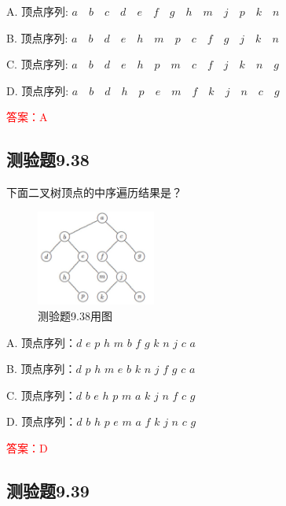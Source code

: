 \documentclass[UTF8, heading=true]{ctexart}
\begin{document}
A. 顶点序列: $a \quad b \quad c \quad d \quad e \quad f \quad g \quad h \quad m \quad j \quad p \quad k \quad n$

B. 顶点序列: $a \quad b \quad d \quad e \quad h \quad m \quad p \quad c \quad f \quad g \quad j \quad k \quad n$

C. 顶点序列: $a \quad b \quad d \quad e \quad h \quad p \quad m \quad c \quad f \quad j \quad k \quad n \quad g$

D. 顶点序列: $a \quad b \quad d \quad h \quad p \quad e \quad m \quad f \quad k \quad j \quad n \quad c \quad g$

\textcolor{red}{答案：A}


\subsection{测验题9.38}

下面二叉树顶点的中序遍历结果是？

\begin{figure}[H]
  \centering
  \includegraphics[width=0.35\textwidth]{9.37.jpg} %
  \caption{测验题9.38用图}
\end{figure}

A. 顶点序列：$d$ \quad $e$ \quad $p$ \quad $h$ \quad $m$ \quad $b$ \quad $f$ \quad $g$ \quad $k$ \quad $n$ \quad $j$ \quad $c$ \quad $a$

B. 顶点序列：$d$ \quad $p$ \quad $h$ \quad $m$ \quad $e$ \quad $b$ \quad $k$ \quad $n$ \quad $j$ \quad $f$ \quad $g$ \quad $c$ \quad $a$

C. 顶点序列：$d$ \quad $b$ \quad $e$ \quad $h$ \quad $p$ \quad $m$ \quad $a$ \quad $k$ \quad $j$ \quad $n$ \quad $f$ \quad $c$ \quad $g$

D. 顶点序列：$d$ \quad $b$ \quad $h$ \quad $p$ \quad $e$ \quad $m$ \quad $a$ \quad $f$ \quad $k$ \quad $j$ \quad $n$ \quad $c$ \quad $g$


\textcolor{red}{答案：D}

\subsection{测验题9.39}
\end{document}
